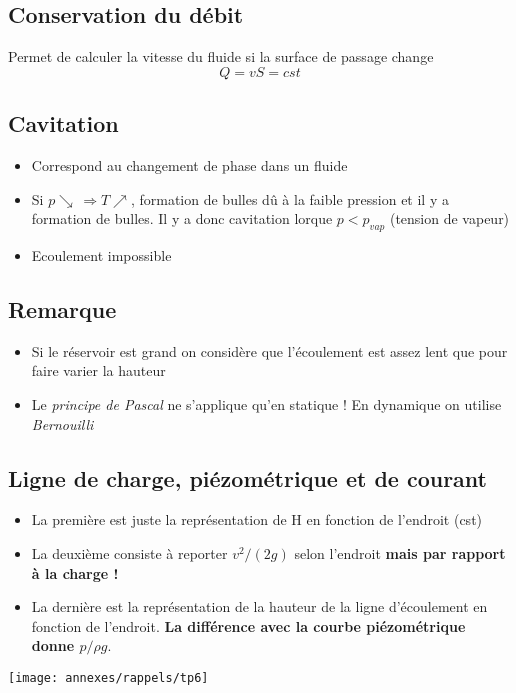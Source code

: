 \subsection*{Conservation du débit}
Permet de calculer la vitesse du fluide si la surface de passage change 
\begin{equation}
	Q = vS = cst
\end{equation}

\subsection*{Cavitation}
\begin{itemize}
	\item Correspond au changement de phase dans un fluide
	\item Si $p \searrow \, \Rightarrow T \nearrow$, formation de bulles dû à la faible pression et il y a formation de bulles. Il y a donc cavitation lorque $p < p_{vap}$ (tension de vapeur)
	\item Ecoulement impossible
\end{itemize}

\subsection*{Remarque}
\begin{itemize}
	\item Si le réservoir est grand on considère que l'écoulement est assez lent que pour faire varier la hauteur
	\item Le \textit{principe de Pascal} ne s'applique qu'en statique ! En dynamique on utilise \textit{Bernouilli}
\end{itemize}

\subsection*{Ligne de charge, piézométrique et de courant}
\begin{itemize}
	\item La première est juste la représentation de H en fonction de l'endroit (cst)
	\item La deuxième consiste à reporter $v^2/(2 g)$ selon l'endroit \textbf{mais par rapport à la charge !}
	\item La dernière est la représentation de la hauteur de la ligne d'écoulement en fonction de l'endroit. \textbf{La différence avec la courbe piézométrique donne $p/\rho g$}.
\end{itemize}
\begin{center}
	\texttt{[image: annexes/rappels/tp6]}
\end{center}